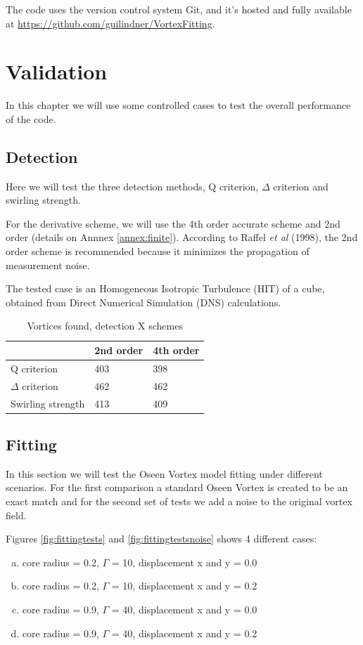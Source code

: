 \documentclass[12pt, a4paper, openany]{memoir}
\begin{document}
The code uses the version control system Git, and it's hosted and fully available at \url{https://github.com/guilindner/VortexFitting}. 


\chapter{Validation}
In this chapter we will use some controlled cases to test the overall performance of the code.

\section{Detection}
Here we will test the three detection methods, Q criterion, $\Delta$ criterion and swirling strength.

For the derivative scheme, we will use the 4th order accurate scheme and 2nd order (details on Annnex \ref{annex:finite}). According to Raffel \textit{et al} (1998), the 2nd order scheme is recommended because it minimizes the propagation of measurement noise.   

The tested case is an Homogeneous Isotropic Turbulence (HIT) of a cube, obtained from Direct Numerical Simulation (DNS) calculations.

\begin{table}[h]
	\centering
	\caption{Vortices found, detection X schemes}
	\vspace{10px}
	\label{tb:detection}
	\begin{tabular}{l|l|l}
		         & 2nd order      & 4th order  \\
		\hline
		Q criterion  & 403  & 398  \\
		$\Delta$ criterion & 462  & 462 \\
		Swirling strength    & 413  & 409
	\end{tabular}
\end{table}

\section{Fitting}

In this section we will test the Oseen Vortex model fitting under different scenarios. For the first comparison a standard Oseen Vortex is created to be an exact match and for the second set of tests we add a noise to the original vortex field.

Figures \ref{fig:fittingtests} and \ref{fig:fittingtestsnoise} shows 4 different cases:
\begin{enumerate}[(a)]
	\item core radius = 0.2, $\Gamma$ = 10, displacement x and y = 0.0
	\item core radius = 0.2, $\Gamma$ = 10, displacement x and y = 0.2
	\item core radius = 0.9, $\Gamma$ = 40, displacement x and y = 0.0
	\item core radius = 0.9, $\Gamma$ = 40, displacement x and y = 0.2  
\end{enumerate}
\end{document}

